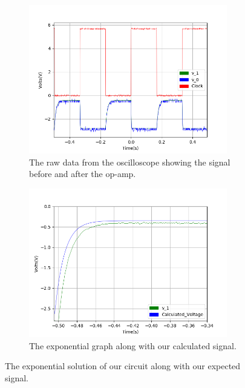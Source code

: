 \begin{figure}[h!]
\centering
\begin{subfigure}[t]{.475\textwidth}
  \centering
  \includegraphics[width=0.95\textwidth, height=0.25\textheight]{figures/Exponential/scope_26raw.png}
  \caption{The raw data from the oscilloscope showing the signal before and after the op-amp.}
 \label{fig:Exp_0_raw}
\end{subfigure}\hfill
\begin{subfigure}[t]{.475\textwidth}
  \centering
  \includegraphics[width=0.95\textwidth, height=0.25\textheight]{figures/Exponential/scope_26_calc.png}
  \caption{The exponential graph along with our calculated signal.}
\label{fig:Exp_0_calc}
\end{subfigure}
\caption{The exponential solution of our circuit along with our expected signal.}
\label{fig:Exp_0}
\end{figure}

